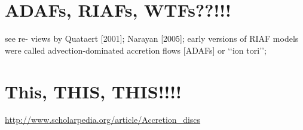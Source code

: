 \documentclass[11pt,a4paper]{article}
\begin{document}
\section{ADAFs, RIAFs, WTFs??!!!}
see re- views by Quataert [2001]; Narayan [2005]; early versions of RIAF models were called advection-dominated accretion flows [ADAFs] or ‘‘ion tori’’;


\section{This, THIS, THIS!!!!}
\href{http://www.scholarpedia.org/article/Accretion\_discs}{http://www.scholarpedia.org/article/Accretion\_discs}





\end{document}
